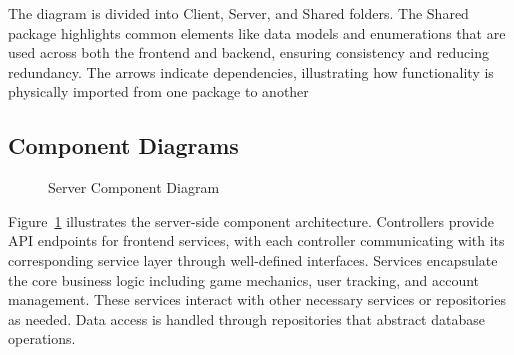 \documentclass[11pt,a4paper]{article}
\newcommand{\inputdiagram}[1]{}
\newcommand{\textwidthdiagram}[2][1]{%
  \resizebox{#1\textwidth}{!}{\inputdiagram{#2}}%
}
\begin{document}
The diagram is divided into Client, Server, and Shared folders. The Shared package highlights common elements like data models and enumerations that are used across both the frontend and backend, ensuring consistency and reducing redundancy. The arrows indicate dependencies, illustrating how functionality is physically imported from one package to another



\subsection{Component Diagrams}

\begin{figure}[H]
    \centering
    \textwidthdiagram{server_component_diagram.latex}
    \caption{Server Component Diagram}
    \label{fig:server_component_diagram}
\end{figure}

Figure~\ref{fig:server_component_diagram} illustrates the server-side component architecture. Controllers provide API endpoints for frontend services, with each controller communicating with its corresponding service layer through well-defined interfaces. Services encapsulate the core business logic including game mechanics, user tracking, and account management. These services interact with other necessary services or repositories as needed. Data access is handled through repositories that abstract database operations.
\end{document}
